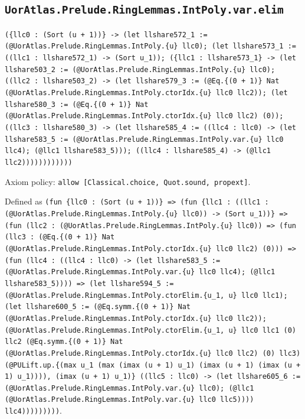 \documentclass[11pt]{article}
\begin{document}
\subsection*{\texttt{UorAtlas.Prelude.RingLemmas.IntPoly.var.elim}}
\noindent\texttt{(\{llc0 : (Sort (u + 1))\} -> (let llshare572\_1 := (@UorAtlas.Prelude.RingLemmas.IntPoly.\{u\} llc0); (let llshare573\_1 := ((llc1 : llshare572\_1) -> (Sort u\_1)); (\{llc1 : llshare573\_1\} -> (let llshare503\_2 := (@UorAtlas.Prelude.RingLemmas.IntPoly.\{u\} llc0); ((llc2 : llshare503\_2) -> (let llshare579\_3 := (@Eq.\{(0 + 1)\} Nat (@UorAtlas.Prelude.RingLemmas.IntPoly.ctorIdx.\{u\} llc0 llc2)); (let llshare580\_3 := (@Eq.\{(0 + 1)\} Nat (@UorAtlas.Prelude.RingLemmas.IntPoly.ctorIdx.\{u\} llc0 llc2) (0)); ((llc3 : llshare580\_3) -> (let llshare585\_4 := ((llc4 : llc0) -> (let llshare583\_5 := (@UorAtlas.Prelude.RingLemmas.IntPoly.var.\{u\} llc0 llc4); (@llc1 llshare583\_5))); ((llc4 : llshare585\_4) -> (@llc1 llc2))))))))))))}\par
\noindent Axiom policy: \texttt{allow [Classical.choice, Quot.sound, propext]}.\par
\noindent Defined as \texttt{(fun \{llc0 : (Sort (u + 1))\} => (fun \{llc1 : ((llc1 : (@UorAtlas.Prelude.RingLemmas.IntPoly.\{u\} llc0)) -> (Sort u\_1))\} => (fun (llc2 : (@UorAtlas.Prelude.RingLemmas.IntPoly.\{u\} llc0)) => (fun (llc3 : (@Eq.\{(0 + 1)\} Nat (@UorAtlas.Prelude.RingLemmas.IntPoly.ctorIdx.\{u\} llc0 llc2) (0))) => (fun (llc4 : ((llc4 : llc0) -> (let llshare583\_5 := (@UorAtlas.Prelude.RingLemmas.IntPoly.var.\{u\} llc0 llc4); (@llc1 llshare583\_5)))) => (let llshare594\_5 := (@UorAtlas.Prelude.RingLemmas.IntPoly.ctorElim.\{u\_1, u\} llc0 llc1); (let llshare600\_5 := (@Eq.symm.\{(0 + 1)\} Nat (@UorAtlas.Prelude.RingLemmas.IntPoly.ctorIdx.\{u\} llc0 llc2)); (@UorAtlas.Prelude.RingLemmas.IntPoly.ctorElim.\{u\_1, u\} llc0 llc1 (0) llc2 (@Eq.symm.\{(0 + 1)\} Nat (@UorAtlas.Prelude.RingLemmas.IntPoly.ctorIdx.\{u\} llc0 llc2) (0) llc3) (@PULift.up.\{(max u\_1 (max (imax (u + 1) u\_1) (imax (u + 1) (imax (u + 1) u\_1)))), (imax (u + 1) u\_1)\} ((llc5 : llc0) -> (let llshare605\_6 := (@UorAtlas.Prelude.RingLemmas.IntPoly.var.\{u\} llc0); (@llc1 (@UorAtlas.Prelude.RingLemmas.IntPoly.var.\{u\} llc0 llc5)))) llc4)))))))))}.\par
\end{document}
